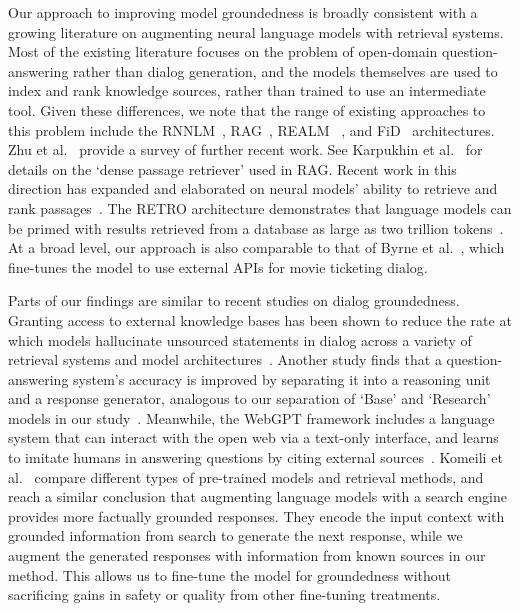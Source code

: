 \documentclass{article}
\begin{document}
Our approach to improving model groundedness is broadly consistent with a growing literature on augmenting neural language models with retrieval systems. Most of the existing literature focuses on the problem of open-domain question-answering rather than dialog generation, and the models themselves are used to index and rank knowledge sources, rather than trained to use an intermediate tool. Given these differences, we note that the range of existing approaches to this problem include the RNNLM~\cite{khandelwal2019generalization}, RAG~\cite{lewis2021retrieval}, REALM~
\cite{guu2020realm}, and FiD~\cite{izacard2021leveraging} architectures. Zhu et al.~\cite{zhu2021retrieving} provide a survey of further recent work. See Karpukhin et al.~\cite{karpukhin2020dense} for details on the ‘dense passage retriever’ used in RAG. Recent work in this direction has expanded and elaborated on neural models’ ability to retrieve and rank passages~\cite{lesota2021modern}. The RETRO architecture demonstrates that language models can be primed with results retrieved from a database as large as two trillion tokens~\cite{borgeaud2021improving}. At a broad level, our approach is also comparable to that of Byrne et al.~\cite{tickettalk}, which fine-tunes the model to use external APIs for movie ticketing dialog.

Parts of our findings are similar to recent studies on dialog groundedness. Granting access to external knowledge bases has been shown to reduce the rate at which models hallucinate unsourced statements in dialog across a variety of retrieval systems and model architectures~\cite{shuster2021retrieval}. Another study finds that a question-answering system's accuracy is improved by separating it into a reasoning unit and a response generator, analogous to our separation of `Base' and `Research' models in our study~\cite{adolphs2021reason}. Meanwhile, the WebGPT framework includes a language system that can interact with the open web via a text-only interface, and learns to imitate humans in answering questions by citing external sources~\cite{nakano2021webgpt}.
Komeili et al.~\cite{komeili2021internetaugmented} compare different types of pre-trained models and retrieval methods, and reach a similar conclusion that augmenting language models with a search engine provides more factually grounded responses. 
They encode the input context with grounded information from search to generate the next response, while we augment the generated responses with information from known sources in our method. This allows us to fine-tune the model for groundedness without sacrificing gains in safety or quality from other fine-tuning treatments.
\end{document}
